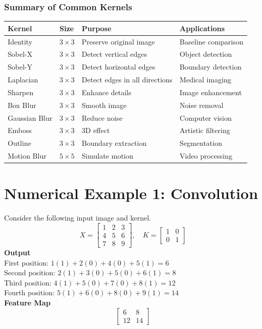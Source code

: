 \documentclass[11pt]{article}
\begin{document}
\subsubsection*{Summary of Common Kernels}
\begin{table}[h!]
    \centering
    \begin{tabular}{|l|l|l|p{4cm}|}
        \hline
        \textbf{Kernel} & \textbf{Size} & \textbf{Purpose} & \textbf{Applications} \\ \hline
        Identity & $3\times3$ & Preserve original image & Baseline comparison \\ \hline 
        Sobel-X & $3\times3$ & Detect vertical edges & Object detection \\ \hline 
        Sobel-Y & $3\times3$ & Detect horizontal edges & Boundary detection \\ \hline 
        Laplacian & $3\times3$ & Detect edges in all directions & Medical imaging \\ \hline 
        Sharpen & $3\times3$ & Enhance details & Image enhancement \\ \hline 
        Box Blur & $3\times3$ & Smooth image & Noise removal \\ \hline 
        Gaussian Blur & $3\times3$ & Reduce noise & Computer vision \\ \hline 
        Emboss & $3\times3$ & 3D effect & Artistic filtering \\ \hline 
        Outline & $3\times3$ & Boundary extraction & Segmentation \\ \hline 
        Motion Blur & $5\times5$ & Simulate motion & Video processing \\ \hline 
    \end{tabular}
\end{table}

\section{Numerical Example 1: Convolution}
Consider the following input image and kernel. 
$$ X = \begin{bmatrix} 1 & 2 & 3 \\ 4 & 5 & 6 \\ 7 & 8 & 9 \end{bmatrix}, \quad K = \begin{bmatrix} 1 & 0 \\ 0 & 1 \end{bmatrix} $$
\textbf{Output} \\
First position: $1(1) + 2(0) + 4(0) + 5(1) = 6$  \\
Second position: $2(1) + 3(0) + 5(0) + 6(1) = 8$  \\
Third position: $4(1) + 5(0) + 7(0) + 8(1) = 12$  \\
Fourth position: $5(1) + 6(0) + 8(0) + 9(1) = 14$  \\[0.2cm]
\textbf{Feature Map}
$$ \begin{bmatrix} 6 & 8 \\ 12 & 14 \end{bmatrix} $$ 
\end{document}

